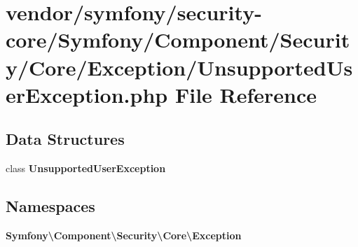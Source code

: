 \section{vendor/symfony/security-\/core/\+Symfony/\+Component/\+Security/\+Core/\+Exception/\+Unsupported\+User\+Exception.php File Reference}
\label{_unsupported_user_exception_8php}
\subsection*{Data Structures}
\begin{DoxyCompactItemize}
\item 
class {\bf Unsupported\+User\+Exception}
\end{DoxyCompactItemize}
\subsection*{Namespaces}
\begin{DoxyCompactItemize}
\item 
 {\bf Symfony\textbackslash{}\+Component\textbackslash{}\+Security\textbackslash{}\+Core\textbackslash{}\+Exception}
\end{DoxyCompactItemize}

